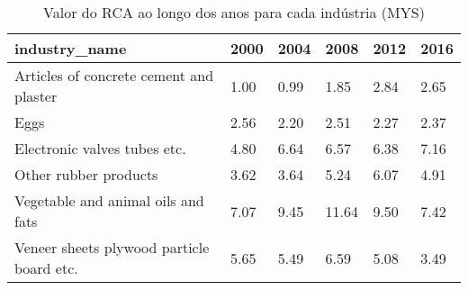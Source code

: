 \begin{table}
\centering
\caption{Valor do RCA ao longo dos anos para cada indústria (MYS)}
\begin{tabular}{p{6cm}p{1.5cm}p{1.5cm}p{1.5cm}p{1.5cm}p{1.5cm}}
\toprule
                            industry\_name & 2000 & 2004 &  2008 & 2012 & 2016 \\
\midrule
  Articles of concrete cement and plaster & 1.00 & 0.99 &  1.85 & 2.84 & 2.65 \\
                                     Eggs & 2.56 & 2.20 &  2.51 & 2.27 & 2.37 \\
             Electronic valves tubes etc. & 4.80 & 6.64 &  6.57 & 6.38 & 7.16 \\
                    Other rubber products & 3.62 & 3.64 &  5.24 & 6.07 & 4.91 \\
       Vegetable and animal oils and fats & 7.07 & 9.45 & 11.64 & 9.50 & 7.42 \\
Veneer sheets plywood particle board etc. & 5.65 & 5.49 &  6.59 & 5.08 & 3.49 \\
\bottomrule
\end{tabular}
\end{table}
